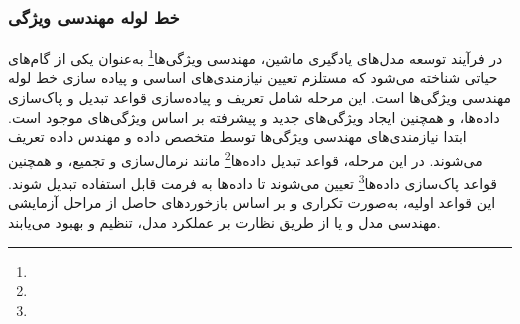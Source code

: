 \subsubsection{خط لوله مهندسی ویژگی}
در فرآیند توسعه مدل‌های یادگیری ماشین، مهندسی ویژگی‌ها\footnote{} به‌عنوان یکی از گام‌های حیاتی شناخته می‌شود که مستلزم تعیین نیازمندی‌های اساسی و پیاده سازی خط لوله مهندسی ویژگی‌ها است. این مرحله شامل تعریف و پیاده‌سازی قواعد تبدیل و پاک‌سازی داده‌ها، و همچنین ایجاد ویژگی‌های جدید و پیشرفته بر اساس ویژگی‌های موجود است. ابتدا نیازمندی‌های مهندسی ویژگی‌ها توسط متخصص داده و مهندس داده تعریف می‌شوند. در این مرحله، قواعد تبدیل داده‌ها\footnote{} مانند نرمال‌سازی و تجمیع، و همچنین قواعد پاک‌سازی داده‌ها\footnote{} تعیین می‌شوند تا داده‌ها به فرمت قابل استفاده تبدیل شوند. این قواعد اولیه، به‌صورت تکراری و بر اساس بازخوردهای حاصل از مراحل آزمایشی مهندسی مدل و یا از طریق نظارت بر عملکرد مدل، تنظیم و بهبود می‌یابند.


